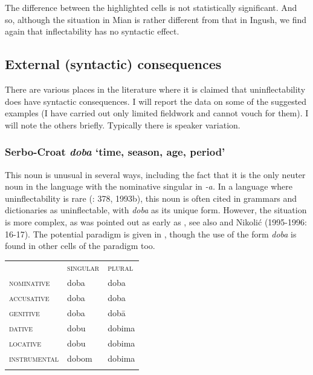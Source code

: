 \documentclass[output=paper]{langscibook}
\begin{document}
The difference between the highlighted cells is not statistically significant. And so, although the situation in Mian is rather different from that in Ingush, we find again that inflectability has no syntactic effect.

\subsection{\textbf{External} \textbf{(syntactic)} \textbf{consequences}}

There are various places in the literature where it is claimed that uninflectability does have syntactic consequences. I will report the data on some of the suggested examples (I have carried out only limited fieldwork and cannot vouch for them). I will note the others briefly. Typically there is speaker variation. 

\subsubsection{\textbf{Serbo-Croat} \textbf{\textit{doba}} \textbf{‘time,} \textbf{season,} \textbf{age,} \textbf{period’}}

This noun is unusual in several ways, including the fact that it is the only neuter noun in the language with the nominative singular in \textit{{}-a.} In a language where uninflectability is rare (\citealt{Browne1993a}: 378, 1993b), this noun is often cited in grammars and dictionaries as uninflectable, with \textit{doba} as its unique form. However, the situation is more complex, as was pointed out as early as \citet[246]{Kovačević1951}, see also \citet[212-214]{Stevanović1975} and Nikolić (1995-1996: 16-17). The potential paradigm is given in , though the use of the form \textit{doba} is found in other cells of the paradigm too.


\begin{tabularx}{\textwidth}{XXX}

\lsptoprule
\multicolumn{1}{c}{} & \textsc{singular} & \textsc{plural}\\
\textsc{nominative} & doba & doba\\
\textsc{accusative} & doba & doba\\
\textsc{genitive} & doba & dobā\\
\textsc{dative} & dobu & dobima\\
\textsc{locative} & dobu & dobima\\
\textsc{instrumental} & dobom & dobima\\
\lspbottomrule
\end{tabularx}
\begin{table}
\caption{Inflection of Serbo-Croat \textit{doba} ‘time’ \citep[79]{Benson1971}}
\label{tab:key:18}
\end{table}
\end{document}

